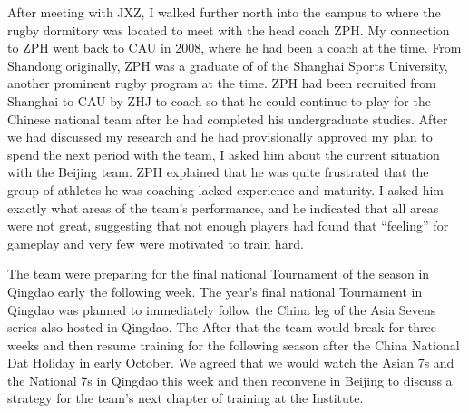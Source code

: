 

After meeting with JXZ, I walked further north into the campus to where the rugby dormitory was located to meet with the head coach ZPH. My connection to ZPH went back to CAU in 2008, where he had been a coach at the time. From Shandong originally, ZPH was a graduate of of the Shanghai Sports University, another prominent rugby program at the time.  ZPH had been recruited from Shanghai to CAU by ZHJ to coach so that he could continue to play for the Chinese national team after he had completed his undergraduate studies.  After we had discussed my research and he had provisionally approved my plan to spend the next period with the team, I asked him about the current situation with the Beijing team.  ZPH explained that he was quite frustrated that the group of athletes he was coaching lacked experience and maturity. I asked him exactly what areas of the team's performance, and he indicated that all areas were not great, suggesting that not enough players had found that ``feeling'' for gameplay and very few were motivated to train hard.

The team were preparing for the final national Tournament of the season in Qingdao early the following week. The year's final national Tournament in Qingdao was planned to immediately follow the China leg of the Asia Sevens series also hosted in Qingdao. The After that the team would break for three weeks and then resume training for the following season after the China National Dat Holiday in early October.  We agreed that we would watch the Asian 7s and the National 7s in Qingdao this week and then reconvene in Beijing to discuss a strategy for the team's next chapter of training at the Institute.




